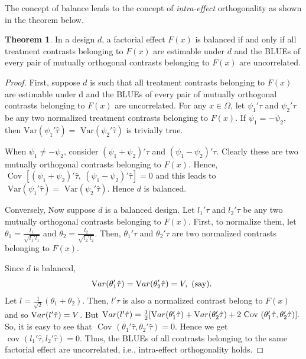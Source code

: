 \documentclass[12pt]{article}
\theoremstyle{definition}
\newtheorem{thm}{Theorem}
\newenvironment{theorem}{
\begin{tcolorbox}[colback=green!5!white,colframe=green!75!black, parbox = false]\begin{thm} }{\end{thm}\end{tcolorbox} }
\begin{document}
The concept of balance leads to the concept of \textit{intra-effect} orthogonality as shown in the theorem below.

\begin{theorem}
    In a design $d$, a factorial effect $F(x)$ is balanced if and only if all treatment contrasts belonging to $F(x)$ are estimable under $d$ and the BLUEs of every pair of mutually orthogonal contrasts belonging to $F(x)$ are uncorrelated.
\end{theorem}

\begin{proof}
    First, suppose  $d$ is such that all treatment contrasts belonging to $F(x)$ are estimable under d and the BLUEs of every pair of mutually orthogonal contrasts belonging to $F(x)$ are uncorrelated. For any $x \in \Omega$, let $\psi_1'\tau$ and $\psi_2'\tau$ be any two normalized treatment contrasts belonging to $F(x)$.  If $\psi_1 = -\psi_2$, then ${\mbox {Var}} (\psi_1'\hat{{\tau}}) = {\mbox{  Var}} (\psi_2'\hat{{\tau}})$ is trivially true. 
    
    When $\psi_1 \neq -\psi_2$, consider $(\psi_1 + \psi_2)'\tau$ and  $(\psi_1 - \psi_2)'\tau$. Clearly these are two mutually orthogonal contrasts belonging to $F(x)$. Hence, ${\mbox{ Cov }}[(\psi_1 + \psi_2)'\hat{\tau}, \ (\psi_1 - \psi_2)'\hat{\tau}]=0$ and this leads to ${\mbox{ Var}} (\psi_1'\hat{{\tau}})={\mbox { Var}} (\psi_2'\hat{{\tau}})$. Hence $d$ is balanced.
    
    Conversely, Now suppose $d$ is a balanced design. Let $l_1'{\tau}$ and $l_2'{\tau}$ be any two mutually orthogonal contrasts belonging to $F(x)$. First, to normalize them, let $\theta_1= \frac{l_1}{\sqrt{l_1'l_1}}$ and $\theta_2 = \frac{l_2}{\sqrt{l_2'l_2}}.$ Then, $\theta_1'\tau$ and $\theta_2'\tau$ are two normalized contrasts belonging to $F(x).$ 
    
    Since $d$ is balanced,
    $${\mbox Var} (\theta_1'\hat{{\tau}}) = {\mbox Var}(\theta_2'\hat{{\tau}}) = V,  \mbox{ (say). }$$ 
    Let $l = \frac{1}{\sqrt{2}} (\theta_1+\theta_2).$ Then, $l'\tau$ is also a normalized contrast belong to $F(x)$ and so ${\mbox Var }(l'\hat{{\tau}}) = V$. 
    But ${\mbox Var }(l'\hat{{\tau}}) = \frac{1}{2}[{\mbox Var }(\theta_1'\hat{{\tau}}) + {\mbox Var }(\theta_2'\hat{{\tau}}) + 2 {\mbox { Cov }}(\theta_1'\hat{{\tau}}, \theta_2'\hat{\tau})].$ So,   it is easy to see that $  {\mbox {  Cov }}(\theta_1'\hat{{\tau}}, \theta_2'\hat{{\tau}} ) =0.$  Hence we get $  {\mbox {  cov }}(l_1'\hat{{\tau}}, l_2'\hat{{\tau}} ) =0.$ Thus, the BLUEs of all contrasts belonging to the same factorial effect are uncorrelated, i.e., intra-effect orthogonality holds.
\end{proof}
\end{document}
